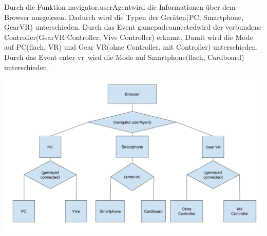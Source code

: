 Durch die Funktion \glqq navigator.userAgent\grqq wird die Informationen über dem Browser ausgelesen. Dadurch wird die Typen der Geräten(PC, Smartphone, GearVR) unterschieden. Durch das Event \glqq gamepadconnected\grqq wird der verbundene Controller(GearVR Controller, Vive Controller) erkannt. Damit wird die Mode auf PC(flach, VR) und Gear VR(ohne Controller, mit Controller) unterschieden. Durch das Event \glqq enter-vr\grqq\ wird die Mode auf Smartphone(flach, Cardboard) unterschieden.
 
 \includegraphics[width=\textwidth]{images/geraeteAnpassen.png}


